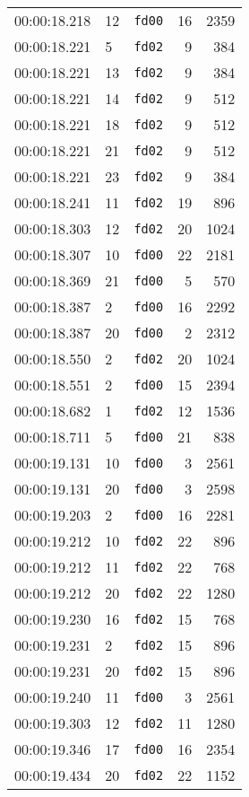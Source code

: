 \documentclass{article}
\begin{document}
\begin{longtable}{lllrr}
00:00:18.218 & 12 & \texttt{fd00} & 16 & 2359 \\
00:00:18.221 & 5 & \texttt{fd02} & 9 & 384 \\
00:00:18.221 & 13 & \texttt{fd02} & 9 & 384 \\
00:00:18.221 & 14 & \texttt{fd02} & 9 & 512 \\
00:00:18.221 & 18 & \texttt{fd02} & 9 & 512 \\
00:00:18.221 & 21 & \texttt{fd02} & 9 & 512 \\
00:00:18.221 & 23 & \texttt{fd02} & 9 & 384 \\
00:00:18.241 & 11 & \texttt{fd02} & 19 & 896 \\
00:00:18.303 & 12 & \texttt{fd02} & 20 & 1024 \\
00:00:18.307 & 10 & \texttt{fd00} & 22 & 2181 \\
00:00:18.369 & 21 & \texttt{fd00} & 5 & 570 \\
00:00:18.387 & 2 & \texttt{fd00} & 16 & 2292 \\
00:00:18.387 & 20 & \texttt{fd00} & 2 & 2312 \\
00:00:18.550 & 2 & \texttt{fd02} & 20 & 1024 \\
00:00:18.551 & 2 & \texttt{fd00} & 15 & 2394 \\
00:00:18.682 & 1 & \texttt{fd02} & 12 & 1536 \\
00:00:18.711 & 5 & \texttt{fd00} & 21 & 838 \\
00:00:19.131 & 10 & \texttt{fd00} & 3 & 2561 \\
00:00:19.131 & 20 & \texttt{fd00} & 3 & 2598 \\
00:00:19.203 & 2 & \texttt{fd00} & 16 & 2281 \\
00:00:19.212 & 10 & \texttt{fd02} & 22 & 896 \\
00:00:19.212 & 11 & \texttt{fd02} & 22 & 768 \\
00:00:19.212 & 20 & \texttt{fd02} & 22 & 1280 \\
00:00:19.230 & 16 & \texttt{fd02} & 15 & 768 \\
00:00:19.231 & 2 & \texttt{fd02} & 15 & 896 \\
00:00:19.231 & 20 & \texttt{fd02} & 15 & 896 \\
00:00:19.240 & 11 & \texttt{fd00} & 3 & 2561 \\
00:00:19.303 & 12 & \texttt{fd02} & 11 & 1280 \\
00:00:19.346 & 17 & \texttt{fd00} & 16 & 2354 \\
00:00:19.434 & 20 & \texttt{fd02} & 22 & 1152 \\

\end{longtable}
\end{document}
